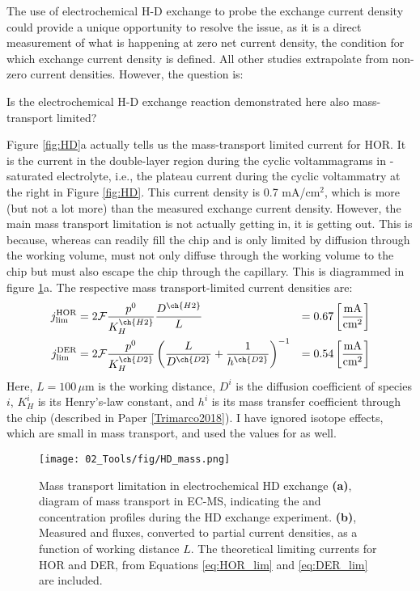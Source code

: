 The use of electrochemical H-D exchange to probe the exchange current density could provide a unique opportunity to resolve the issue, as it is a direct measurement of what is happening at zero net current density, the condition for which exchange current density is defined. All other studies extrapolate from non-zero current densities. However, the question is: 

\begin{question}
	Is the electrochemical H-D exchange reaction demonstrated here also mass-transport limited?\label{q:HD}
\end{question}

Figure \ref{fig:HD}a actually tells us the mass-transport limited current for HOR. It is the current in the double-layer region during the cyclic voltammagrams in -saturated electrolyte, i.e., the plateau current during the cyclic voltammatry at the right in Figure \ref{fig:HD}. This current density is 0.7 mA/cm$^2$, which is more (but not a lot more) than the measured exchange current density. However, the main mass transport limitation is not actually getting  in, it is getting  out. This is because, whereas  can readily fill the chip and is only limited by diffusion through the working volume,  must not only diffuse through the working volume to the chip but must also escape the chip through the capillary. This is diagrammed in figure \ref{fig:HD_mass}a. The respective mass transport-limited current densities are:
\begin{align}
j_\text{lim}^\text{HOR} &= 2\mathcal{F} \frac{p^0}{K_H^{\ch{H2}}}\frac{D^{\ch{H2}}}{L} &= 0.67\left[\frac{\text{mA}}{\text{cm}^2}\right] \label{eq:HOR_lim}\\
j_\text{lim}^\text{DER} &= 2\mathcal{F} \frac{p^0}{K_H^{\ch{D2}}}\left(\frac{L}{D^{\ch{D2}}} + \frac{1}{h^{\ch{D2}}}\right)^{-1} &= 0.54\left[\frac{\text{mA}}{\text{cm}^2}\right] \label{eq:DER_lim}\\
\end{align}
Here, $L=100\,\mu$m is the working distance, $D^i$ is the diffusion coefficient of species $i$, $K_H^i$ is its Henry's-law constant, and $h^i$ is its mass transfer coefficient through the chip (described in Paper \ref{Trimarco2018}). I have ignored isotope effects, which are small in mass transport, and used the  values for  as well.
\begin{figure}[t]
	\centering
	\texttt{[image: 02\_Tools/fig/HD\_mass.png]}
	\caption{Mass transport limitation in electrochemical HD exchange \textbf{(a)}, diagram of mass transport in EC-MS, indicating the  and  concentration profiles during the HD exchange experiment. \textbf{(b)}, Measured  and  fluxes, converted to partial current densities, as a function of working distance $L$. The theoretical limiting currents for HOR and DER, from Equations \ref{eq:HOR_lim} and \ref{eq:DER_lim} are included.}
	\label{fig:HD_mass}
\end{figure}

